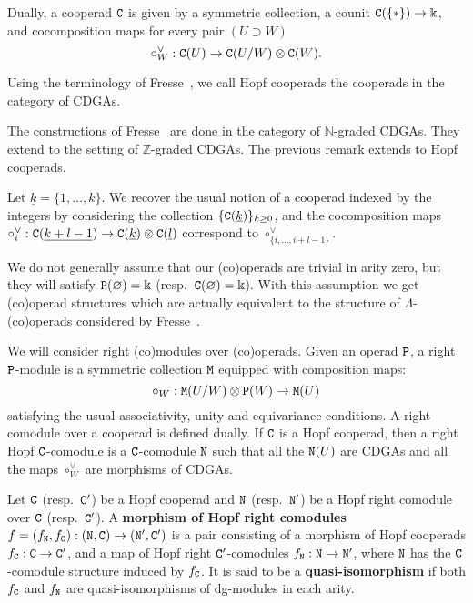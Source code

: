 Dually, a cooperad $\mathtt{C}$ is given by a symmetric collection, a counit $\mathtt{C}(\{*\}) \to \Bbbk$, and cocomposition maps for every pair $(U \supset W)$
\[ \circ_{W}^{\vee} : \mathtt{C}(U) \to \mathtt{C}(U/W) \otimes \mathtt{C}(W). \]

Using the terminology of Fresse~\cite{Fresse2017}, we call Hopf cooperads the cooperads in the category of CDGAs.

\begin{remark}
  The constructions of Fresse~\cite{Fresse2017} are done in the category of $\mathbb{N}$-graded CDGAs.
  They extend to the setting of $\mathbb{Z}$-graded CDGAs.
  The previous remark extends to Hopf cooperads.
\end{remark}

Let $\underline{k} = \{1,\dots,k\}$.
We recover the usual notion of a cooperad indexed by the integers by considering the collection $\{\mathtt{C}(\underline{k})\}_{k \ge 0}$, and the cocomposition maps $\circ_{i}^{\vee} : \mathtt{C}(\underline{k+l-1}) \to \mathtt{C}(\underline{k}) \otimes \mathtt{C}(\underline{l})$ correspond to $\circ_{\{i, \dots, i+l-1\}}^{\vee}$.

We do not generally assume that our (co)operads are trivial in arity zero, but they will satisfy $\mathtt{P}(\varnothing) = \Bbbk$ (resp.\ $\mathtt{C}(\varnothing) = \Bbbk$).
With this assumption we get (co)operad structures which are actually equivalent to the structure of $\Lambda$-(co)operads considered by Fresse~\cite{Fresse2017}.

We will consider right (co)modules over (co)operads.
Given an operad $\mathtt{P}$, a right $\mathtt{P}$-module is a symmetric collection $\mathtt{M}$ equipped with composition maps:
\[ \circ_{W} : \mathtt{M}(U/W) \otimes \mathtt{P}(W) \to \mathtt{M}(U) \]
satisfying the usual associativity, unity and equivariance conditions.
A right comodule over a cooperad is defined dually.
If $\mathtt{C}$ is a Hopf cooperad, then a right Hopf $\mathtt{C}$-comodule is a $\mathtt{C}$-comodule $\mathtt{N}$ such that all the $\mathtt{N}(U)$ are CDGAs and all the maps $\circ_{W}^{\vee}$ are morphisms of CDGAs.

\begin{definition}
  \label{cnf.def.mph-comod}
  Let $\mathtt{C}$ (resp.\ $\mathtt{C}'$) be a Hopf cooperad and $\mathtt{N}$ (resp.\ $\mathtt{N}'$) be a Hopf right comodule over $\mathtt{C}$ (resp.\ $\mathtt{C}'$).
  A \textbf{morphism of Hopf right comodules} $f = (f_{\mathtt{N}}, f_{\mathtt{C}}) : (\mathtt{N}, \mathtt{C}) \to (\mathtt{N}', \mathtt{C}')$ is a pair consisting of a morphism of Hopf cooperads $f_{\mathtt{C}} : \mathtt{C} \to \mathtt{C}'$, and a map of Hopf right $\mathtt{C}'$-comodules $f_{\mathtt{N}} : \mathtt{N} \to \mathtt{N}'$, where $\mathtt{N}$ has the $\mathtt{C}$-comodule structure induced by $f_{\mathtt{C}}$.
  It is said to be a \textbf{quasi-isomorphism} if both $f_{\mathtt{C}}$ and $f_{\mathtt{N}}$ are quasi-isomorphisms of dg-modules in each arity.
\end{definition}

